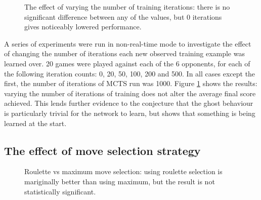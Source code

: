 \begin{figure}
\centering
{}
\caption[The effect of varying the number of training iterations]{The effect of varying the number of training iterations: there is no significant difference between any of the values, but 0 iterations gives noticeably lowered performance.}
\label{fig:resultsiterations}
\end{figure}


A series of experiments were run in non-real-time mode to investigate the effect of changing the number of iterations each new observed training example was learned over.  20 games were played against each of the 6 opponents, for each of the following iteration counts: 0, 20, 50, 100, 200 and 500.  In all cases except the first, the number of iterations of MCTS run was 1000.  Figure \ref{fig:resultsiterations} shows the results: varying the number of iterations of training does not alter the average final score achieved.  This lends further evidence to the conjecture that the ghost behaviour is particularly trivial for the network to learn, but shows that something is being learned at the start.


\subsection{The effect of move selection strategy}

\begin{figure}
\centering
{}
\caption[Roulette vs maximum move selection]{Roulette vs maximum move selection: using roulette selection is mariginally better than using maximum, but the result is not statistically significant.}
\label{fig:resultsmax}
\end{figure}

